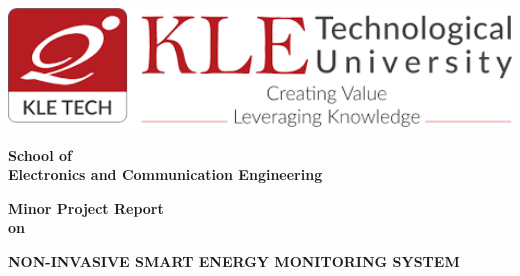 \documentclass[12 pt]{report}
\begin{document}
\begin{center}
\includegraphics[width=6.3in]{images/BVB.png} 
\end{center}



\begin{center}
\begin{Large}
\textbf{\linebreak School of \linebreak \\Electronics and Communication Engineering
}
\end{Large}
\end{center}

\begin{center}
\begin{Large}
\textbf{\linebreak \linebreak Minor Project Report
\linebreak \\on}
\end{Large}
\end{center}

\begin{center}
\begin{LARGE}
\textbf{NON-INVASIVE SMART ENERGY MONITORING SYSTEM}
\linebreak\\
\end{LARGE}
\end{center}

\vspace{2cm}
\end{document}

